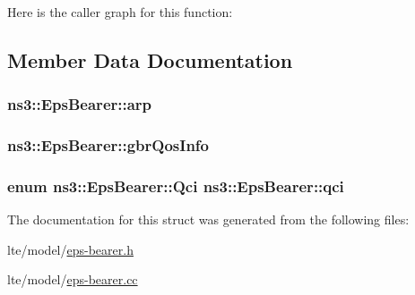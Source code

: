 Here is the caller graph for this function\+:




\subsection{Member Data Documentation}
\subsubsection[{\texorpdfstring{arp}{arp}}]{ ns3\+::\+Eps\+Bearer\+::arp}\hypertarget{structns3_1_1EpsBearer_a21ff4ef25028190028f0f31a60516b88}{}\label{structns3_1_1EpsBearer_a21ff4ef25028190028f0f31a60516b88}
\subsubsection[{\texorpdfstring{gbr\+Qos\+Info}{gbrQosInfo}}]{ ns3\+::\+Eps\+Bearer\+::gbr\+Qos\+Info}\hypertarget{structns3_1_1EpsBearer_ad24c092b1584eee3ae904b4b0fcf45cb}{}\label{structns3_1_1EpsBearer_ad24c092b1584eee3ae904b4b0fcf45cb}
\subsubsection[{\texorpdfstring{qci}{qci}}]{\setlength{\rightskip}{0pt plus 5cm}enum {\bf ns3\+::\+Eps\+Bearer\+::\+Qci}  ns3\+::\+Eps\+Bearer\+::qci}\hypertarget{structns3_1_1EpsBearer_a9d5f4e6cb35091c9883cc7dd4b2d95db}{}\label{structns3_1_1EpsBearer_a9d5f4e6cb35091c9883cc7dd4b2d95db}


The documentation for this struct was generated from the following files\+:\begin{DoxyCompactItemize}
\item 
lte/model/\hyperlink{eps-bearer_8h}{eps-\/bearer.\+h}\item 
lte/model/\hyperlink{eps-bearer_8cc}{eps-\/bearer.\+cc}\end{DoxyCompactItemize}
